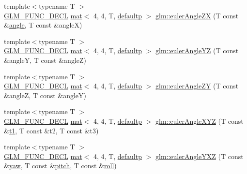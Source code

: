 \begin{DoxyCompactItemize}
\item 
{\footnotesize template$<$typename T $>$ }\\\mbox{\hyperlink{setup_8hpp_ab2d052de21a70539923e9bcbf6e83a51}{G\+L\+M\+\_\+\+F\+U\+N\+C\+\_\+\+D\+E\+CL}} \mbox{\hyperlink{structglm_1_1mat}{mat}}$<$ 4, 4, T, \mbox{\hyperlink{namespaceglm_a36ed105b07c7746804d7fdc7cc90ff25a9d21ccd8b5a009ec7eb7677befc3bf51}{defaultp}} $>$ \mbox{\hyperlink{group__gtx__euler__angles_ga483903115cd4059228961046a28d69b5}{glm\+::euler\+Angle\+ZX}} (T const \&\mbox{\hyperlink{_s_d_l__opengl__glext_8h_a9e06c1f76a20fed54ca742cd25cb02c4}{angle}}, T const \&angleX)
\item 
{\footnotesize template$<$typename T $>$ }\\\mbox{\hyperlink{setup_8hpp_ab2d052de21a70539923e9bcbf6e83a51}{G\+L\+M\+\_\+\+F\+U\+N\+C\+\_\+\+D\+E\+CL}} \mbox{\hyperlink{structglm_1_1mat}{mat}}$<$ 4, 4, T, \mbox{\hyperlink{namespaceglm_a36ed105b07c7746804d7fdc7cc90ff25a9d21ccd8b5a009ec7eb7677befc3bf51}{defaultp}} $>$ \mbox{\hyperlink{group__gtx__euler__angles_ga220379e10ac8cca55e275f0c9018fed9}{glm\+::euler\+Angle\+YZ}} (T const \&angleY, T const \&angleZ)
\item 
{\footnotesize template$<$typename T $>$ }\\\mbox{\hyperlink{setup_8hpp_ab2d052de21a70539923e9bcbf6e83a51}{G\+L\+M\+\_\+\+F\+U\+N\+C\+\_\+\+D\+E\+CL}} \mbox{\hyperlink{structglm_1_1mat}{mat}}$<$ 4, 4, T, \mbox{\hyperlink{namespaceglm_a36ed105b07c7746804d7fdc7cc90ff25a9d21ccd8b5a009ec7eb7677befc3bf51}{defaultp}} $>$ \mbox{\hyperlink{group__gtx__euler__angles_ga400b2bd5984999efab663f3a68e1d020}{glm\+::euler\+Angle\+ZY}} (T const \&angleZ, T const \&angleY)
\item 
{\footnotesize template$<$typename T $>$ }\\\mbox{\hyperlink{setup_8hpp_ab2d052de21a70539923e9bcbf6e83a51}{G\+L\+M\+\_\+\+F\+U\+N\+C\+\_\+\+D\+E\+CL}} \mbox{\hyperlink{structglm_1_1mat}{mat}}$<$ 4, 4, T, \mbox{\hyperlink{namespaceglm_a36ed105b07c7746804d7fdc7cc90ff25a9d21ccd8b5a009ec7eb7677befc3bf51}{defaultp}} $>$ \mbox{\hyperlink{group__gtx__euler__angles_ga1975e0f0e9bed7f716dc9946da2ab645}{glm\+::euler\+Angle\+X\+YZ}} (T const \&\mbox{\hyperlink{_s_d_l__opengl__glext_8h_af48031a37b713afa3b0d0d7d29653d7c}{t1}}, T const \&t2, T const \&t3)
\item 
{\footnotesize template$<$typename T $>$ }\\\mbox{\hyperlink{setup_8hpp_ab2d052de21a70539923e9bcbf6e83a51}{G\+L\+M\+\_\+\+F\+U\+N\+C\+\_\+\+D\+E\+CL}} \mbox{\hyperlink{structglm_1_1mat}{mat}}$<$ 4, 4, T, \mbox{\hyperlink{namespaceglm_a36ed105b07c7746804d7fdc7cc90ff25a9d21ccd8b5a009ec7eb7677befc3bf51}{defaultp}} $>$ \mbox{\hyperlink{group__gtx__euler__angles_gab8ba99a9814f6d9edf417b6c6d5b0c10}{glm\+::euler\+Angle\+Y\+XZ}} (T const \&\mbox{\hyperlink{group__gtc__quaternion_ga53feffeb4001b99e36e216522e465e9e}{yaw}}, T const \&\mbox{\hyperlink{group__gtc__quaternion_ga9bd78e5fe153d07e39fb4c83e73dba73}{pitch}}, T const \&\mbox{\hyperlink{group__gtc__quaternion_ga3ff93afbd9cc29f2ad217f2228e8a95b}{roll}})

\end{DoxyCompactItemize}
